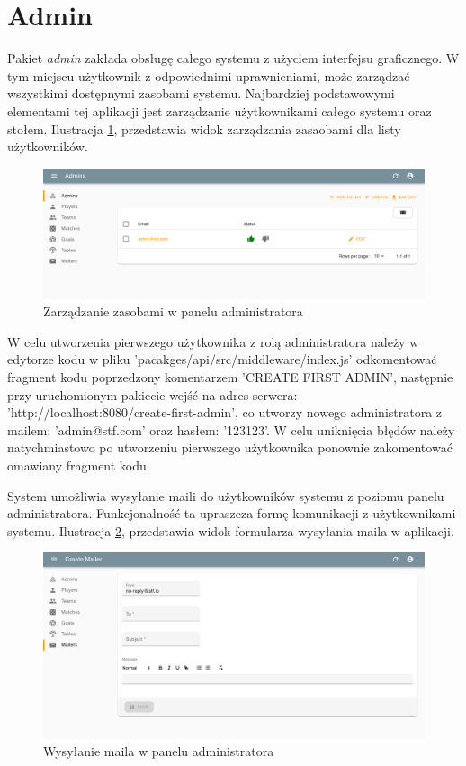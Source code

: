 \section{Admin}

Pakiet \textit{admin} zakłada obsługę całego systemu z użyciem interfejsu graficznego. W tym miejscu użytkownik z odpowiednimi uprawnieniami, może zarządzać wszystkimi dostępnymi zasobami systemu. Najbardziej podstawowymi elementami tej aplikacji jest zarządzanie użytkownikami całego systemu oraz stołem. Ilustracja \ref{fig:admin-manage-resource}, przedstawia widok zarządzania zasaobami dla listy użytkowników.

\begin{figure}[h!]
  \centering
    \includegraphics[width=\textwidth]{images/admin/adminsList.png}
  \caption{Zarządzanie zasobami w panelu administratora}
  \label{fig:admin-manage-resource}
\end{figure}

W celu utworzenia pierwszego użytkownika z rolą administratora należy w edytorze kodu w pliku 'pacakges/api/src/middleware/index.js' odkomentować fragment kodu poprzedzony komentarzem 'CREATE FIRST ADMIN', następnie przy uruchomionym pakiecie wejść na adres serwera: 'http://localhost:8080/create-first-admin', co utworzy nowego administratora z mailem: 'admin@stf.com' oraz hasłem: '123123'. W celu uniknięcia błędów należy natychmiastowo po utworzeniu pierwszego użytkownika ponownie zakomentować omawiany fragment kodu.

\newpage

System umożliwia wysyłanie maili do użytkowników systemu z poziomu panelu administratora. Funkcjonalność ta upraszcza formę komunikacji z użytkownikami systemu. Ilustracja \ref{fig:admin-send-mail}, przedstawia widok formularza wysyłania maila w aplikacji.

\begin{figure}[h!]
  \centering
    \includegraphics[width=\textwidth]{images/admin/mailer.png}
  \caption{Wysyłanie maila w panelu administratora}
  \label{fig:admin-send-mail}
\end{figure}

